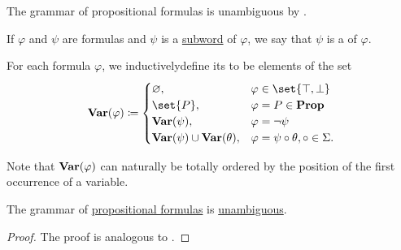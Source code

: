\begin{definition}
\begin{thmenum}
    The grammar of propositional formulas is unambiguous by .

     If \( \varphi \) and \( \psi \) are formulas and \( \psi \) is a \hyperref[def:language/subword]{subword} of \( \varphi \), we say that \( \psi \) is a  of \( \varphi \).

     For each formula \( \varphi \), we inductively\IND define its  to be elements of the set
    \begin{equation}\label{eq:def:propositional_syntax/varables}
      \boldop{Var}(\varphi) \coloneqq \begin{cases}
        \varnothing,                                  &\varphi \in \set{ \top, \bot } \\
        \set{ P },                                    &\varphi = P \in \boldop{Prop} \\
        \boldop{Var}(\psi),                           &\varphi = \neg \psi \\
        \boldop{Var}(\psi) \cup \boldop{Var}(\theta), &\varphi = \psi \bincirc \theta, \bincirc \in \Sigma.
      \end{cases}
    \end{equation}

    Note that \( \operatorname{\mathbf{Var}}(\varphi) \) can naturally be totally ordered by the position of the first occurrence of a variable.
  \end{thmenum}
\end{definition}

\begin{proposition}\label{thm:propositional_formulas_are_unambiguous}
  The grammar of \hyperref[def:propositional_syntax/formula]{propositional formulas} is \hyperref[def:grammar_derivation/ambiguity]{unambiguous}.
\end{proposition}
\begin{proof}
  The proof is analogous to .
\end{proof}

